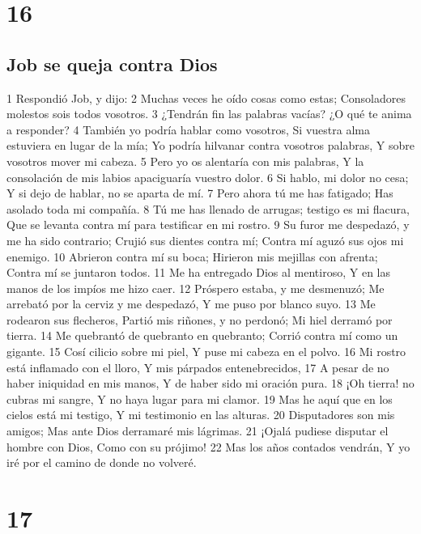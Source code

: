 \chapter{16}

\section*{Job se queja contra Dios}

1 Respondió Job, y dijo:
2 Muchas veces he oído cosas como estas;
Consoladores molestos sois todos vosotros.
3 ¿Tendrán fin las palabras vacías?
¿O qué te anima a responder?
4 También yo podría hablar como vosotros,
Si vuestra alma estuviera en lugar de la mía;
Yo podría hilvanar contra vosotros palabras,
Y sobre vosotros mover mi cabeza.
5 Pero yo os alentaría con mis palabras,
Y la consolación de mis labios apaciguaría vuestro dolor. 
6 Si hablo, mi dolor no cesa;
Y si dejo de hablar, no se aparta de mí.
7 Pero ahora tú me has fatigado;
Has asolado toda mi compañía.
8 Tú me has llenado de arrugas; testigo es mi flacura,
Que se levanta contra mí para testificar en mi rostro.
9 Su furor me despedazó, y me ha sido contrario;
Crujió sus dientes contra mí;
Contra mí aguzó sus ojos mi enemigo.
10 Abrieron contra mí su boca;
Hirieron mis mejillas con afrenta;
Contra mí se juntaron todos.
11 Me ha entregado Dios al mentiroso,
Y en las manos de los impíos me hizo caer.
12 Próspero estaba, y me desmenuzó;
Me arrebató por la cerviz y me despedazó, 
Y me puso por blanco suyo.
13 Me rodearon sus flecheros,
Partió mis riñones, y no perdonó;
Mi hiel derramó por tierra.
14 Me quebrantó de quebranto en quebranto;
Corrió contra mí como un gigante.
15 Cosí cilicio sobre mi piel,
Y puse mi cabeza en el polvo.
16 Mi rostro está inflamado con el lloro,
Y mis párpados entenebrecidos,
17 A pesar de no haber iniquidad en mis manos,
Y de haber sido mi oración pura.
18 ¡Oh tierra! no cubras mi sangre,
Y no haya lugar para mi clamor.
19 Mas he aquí que en los cielos está mi testigo,
Y mi testimonio en las alturas.
20 Disputadores son mis amigos;
Mas ante Dios derramaré mis lágrimas.
21 ¡Ojalá pudiese disputar el hombre con Dios,
Como con su prójimo!
22 Mas los años contados vendrán,
Y yo iré por el camino de donde no volveré.

\chapter{17}

